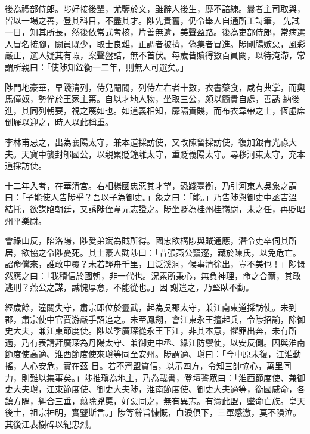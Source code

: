\begin{pinyinscope}
 後為禮部侍郎。陟好接後輩，尤鑒於文，雖辭人後生，靡不諳練。曩者主司取與，皆以一場之善，登其科目，不盡其才。陟先責舊，仍令舉人自通所工詩筆，
 先試一日，知其所長，然後依常式考核，片善無遺，美聲盈路。後為吏部侍郎，常病選人冒名接腳，闕員既少，取士良難，正調者被擠，偽集者冒進。陟剛腸嫉惡，風彩嚴正，選人疑其有瑕，案聲盤詰，無不首伏。每歲皆贖得數百員闕，以待淹滯，常謂所親曰：「使陟知銓衡一二年，則無人可選矣。」



 陟門地豪華，早踐清列，侍兒閹閽，列侍左右者十數，衣書藥食，咸有典掌，而輿馬僮奴，勢侔於王家主第。自以才地人物，坐取三公，頗以簡貴自處，善誘
 納後進，其同列朝要，視之蔑如也。如道義相知，靡隔貴賤，而布衣韋帶之士，恆虛席倒屣以迎之，時人以此稱重。



 李林甫忌之，出為襄陽太守，兼本道採訪使，又改陳留採訪使，復加銀青光祿大夫。天寶中襲封郇國公，以親累貶鐘離太守，重貶義陽太守。尋移河東太守，充本道採訪使。



 十二年入考，在華清宮。右相楊國忠惡其才望，恐踐臺衡，乃引河東人吳象之謂曰：「子能使人告陟乎？吾以子為御史。」象之曰：「能。」乃告陟與御史中丞吉溫
 結托，欲謀陷朝廷，又誘陟侄韋元志證之。陟坐貶為桂州桂嶺尉，未之任，再貶昭州平樂尉。



 會祿山反，陷洛陽，陟愛弟斌為賊所得。國忠欲構陟與賊通應，潛令吏卒伺其所居，欲協之令陟憂死。其士豪人勸陟曰：「昔張燕公竄逐，藏於陳氏，以免危亡。詔命儻來，誰敢申覆？未若輕舟千里，且泛溪洞，候事清徐出，豈不美也！」陟慨然應之曰：「我積信於國朝，非一代也。況素所秉心，無負神理，命之合爾，其敢逃刑？燕公之謀，誠愧厚意，不能從也。」因
 謝遣之，乃堅臥不動。



 經歲餘，潼關失守，肅宗即位於靈武，起為吳郡太守，兼江南東道採訪使。未到郡，肅宗使中官賈游嚴手詔追之。未至鳳翔，會江東永王擅起兵，令陟招諭，除御史大夫，兼江東節度使。陟以季廣琛從永王下江，非其本意，懼罪出奔，未有所適，乃有表請拜廣琛為丹陽太守、兼御史中丞、緣江防禦使，以安反側。因與淮南節度使高適、淮西節度使來瑱等同至安州。陟謂適、瑱曰：「今中原未復，江淮動搖，人心安危，實在茲
 日。若不齊盟質信，以示四方，令知三帥協心，萬里同力，則難以集事矣。」陟推瑱為地主，乃為載書，登壇誓眾曰：「淮西節度使、兼御史大夫瑱，江東節度使、御史大夫陟，淮南節度使、御史大夫適等，銜國威命，各鎮方隅，糾合三垂，翦除兇慝，好惡同之，無有異志。有渝此盟，墜命亡族。皇天後士，祖宗神明，實鑒斯言。」陟等辭旨慷慨，血淚俱下，三軍感激，莫不隕泣。其後江表樹碑以紀忠烈。




\end{pinyinscope}
